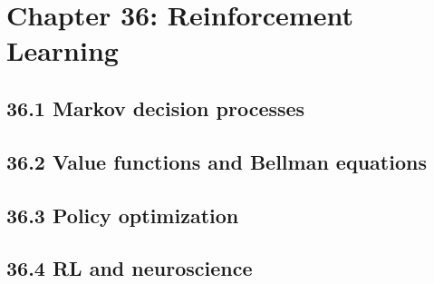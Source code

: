 \section{Chapter 36: Reinforcement Learning}

\subsection{36.1 Markov decision processes}

\subsection{36.2 Value functions and Bellman equations}

\subsection{36.3 Policy optimization}

\subsection{36.4 RL and neuroscience}

\clearpage
